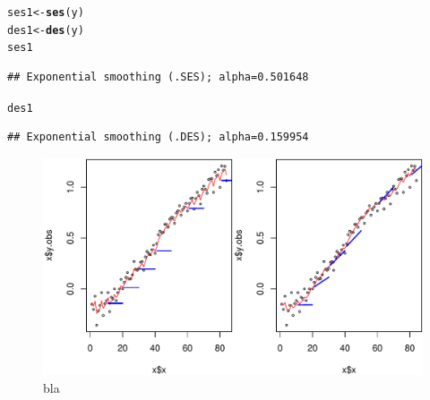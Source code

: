 \documentclass[10pt]{article}\usepackage[]{graphicx}\usepackage[]{color}
\makeatletter
\def\maxwidth{ %
  \ifdim\Gin@nat@width>\linewidth
    \linewidth
  \else
    \Gin@nat@width
  \fi
}
\newcommand{\hlstd}[1]{\textcolor[rgb]{0.345,0.345,0.345}{#1}}%
\newcommand{\hlkwb}[1]{\textcolor[rgb]{0.69,0.353,0.396}{#1}}%
\newcommand{\hlkwd}[1]{\textcolor[rgb]{0.737,0.353,0.396}{\textbf{#1}}}%
\newenvironment{kframe}{%
 \def\at@end@of@kframe{}%
 \ifinner\ifhmode%
  \def\at@end@of@kframe{\end{minipage}}%
  \begin{minipage}{\columnwidth}%
 \fi\fi%
 \def\FrameCommand##1{\hskip\@totalleftmargin \hskip-\fboxsep
 \colorbox{shadecolor}{##1}\hskip-\fboxsep
     \hskip-\linewidth \hskip-\@totalleftmargin \hskip\columnwidth}%
 \MakeFramed {\advance\hsize-\width
   \@totalleftmargin\z@ \linewidth\hsize
   \@setminipage}}%
 {\par\unskip\endMakeFramed%
 \at@end@of@kframe}
\newenvironment{knitrout}{}{} %
\makeatother
\begin{document}
\begin{knitrout}
\color{fgcolor}\begin{kframe}
\begin{alltt}
\hlstd{ses1} \hlkwb{<-} \hlkwd{ses}\hlstd{(y)}
\hlstd{des1} \hlkwb{<-} \hlkwd{des}\hlstd{(y)}
\hlstd{ses1}
\end{alltt}
\begin{verbatim}
## Exponential smoothing (.SES); alpha=0.501648
\end{verbatim}
\begin{alltt}
\hlstd{des1}
\end{alltt}
\begin{verbatim}
## Exponential smoothing (.DES); alpha=0.159954
\end{verbatim}
\end{kframe}
\end{knitrout}

\begin{knitrout}
\color{fgcolor}\begin{figure}
\includegraphics[width=\maxwidth]{fig/graphfig02-1} \caption[bla]{bla}\label{fig:fig02}
\end{figure}


\end{knitrout}






\end{document}
